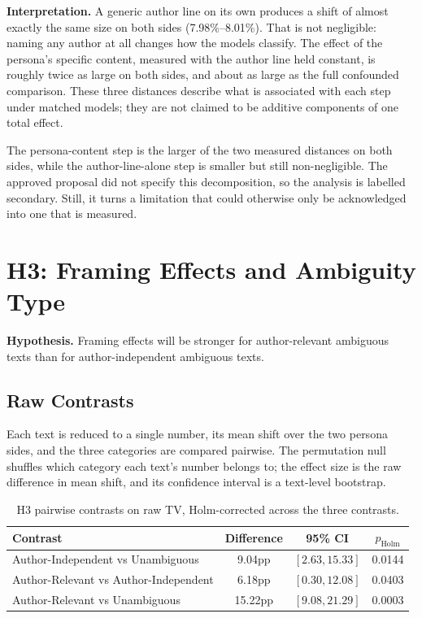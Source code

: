 \noindent
\textbf{Interpretation.} A generic author line on its own produces a shift of almost exactly the
same size on both sides (7.98\%--8.01\%). That is not negligible: naming any author at all
changes how the models classify. The effect of the persona's specific content, measured with the
author line held constant, is roughly twice as large on both sides, and about as large as the
full confounded comparison. These three distances describe what is associated with each step
under matched models; they are not claimed to be additive components of one total effect.

The persona-content step is the larger of the two measured distances on both sides, while the
author-line-alone step is smaller but still non-negligible. The approved proposal did not specify
this decomposition, so the analysis is labelled secondary. Still, it turns a limitation that could
otherwise only be acknowledged into one that is measured.

\section{H3: Framing Effects and Ambiguity Type}
\label{res:h3}

\noindent
\textbf{Hypothesis.} Framing effects will be stronger for author-relevant ambiguous texts than for
author-independent ambiguous texts.

\subsection{Raw Contrasts}
\label{res:h3raw}

\noindent
Each text is reduced to a single number, its mean shift over the two persona sides, and the three
categories are compared pairwise. The permutation null shuffles which category each text's number
belongs to; the effect size is the raw difference in mean shift, and its confidence interval is a
text-level bootstrap.

\begin{table}[h]
\centering
\footnotesize
\caption{H3 pairwise contrasts on raw TV, Holm-corrected across the three contrasts.}
\label{tab:h3raw}
\begin{tabular}{lccc}
\hline
\textbf{Contrast} & \textbf{Difference} & \textbf{95\% CI} & $p_{\text{Holm}}$ \\
\hline
Author-Independent vs Unambiguous     & 9.04pp  & $[2.63, 15.33]$ & 0.0144 \\
Author-Relevant vs Author-Independent & 6.18pp  & $[0.30, 12.08]$ & 0.0403 \\
Author-Relevant vs Unambiguous        & 15.22pp & $[9.08, 21.29]$ & 0.0003 \\
\hline
\end{tabular}
\end{table}

